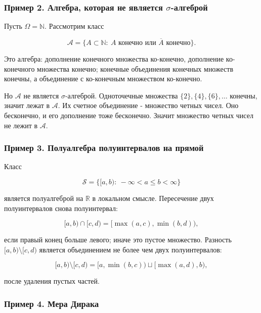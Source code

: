 \documentclass[
  11pt,
  a4paper,
]{article}
\begin{document}
\subsubsection{\texorpdfstring{Пример 2. Алгебра, которая не является
\(\sigma\)-алгеброй}{Пример 2. Алгебра, которая не является \textbackslash sigma-алгеброй}}\label{ux43fux440ux438ux43cux435ux440-2.-ux430ux43bux433ux435ux431ux440ux430-ux43aux43eux442ux43eux440ux430ux44f-ux43dux435-ux44fux432ux43bux44fux435ux442ux441ux44f-sigma-ux430ux43bux433ux435ux431ux440ux43eux439}

Пусть \(\Omega=\mathbb N\). Рассмотрим класс

\[
\mathcal A=\{A\subset\mathbb N:\ A \text{ конечно или } \overline{A} \text{ конечно}\}.
\]

Это алгебра: дополнение конечного множества ко-конечно, дополнение
ко-конечного множества конечно; конечные объединения конечных множеств
конечны, а объединение с ко-конечным множеством ко-конечно.

Но \(\mathcal A\) не является \(\sigma\)-алгеброй. Одноточечные
множества \(\{2\},\{4\},\{6\},\ldots\) конечны, значит лежат в
\(\mathcal A\). Их счетное объединение - множество четных чисел. Оно
бесконечно, и его дополнение тоже бесконечно. Значит множество четных
чисел не лежит в \(\mathcal A\).

\subsubsection{Пример 3. Полуалгебра полуинтервалов на
прямой}\label{ux43fux440ux438ux43cux435ux440-3.-ux43fux43eux43bux443ux430ux43bux433ux435ux431ux440ux430-ux43fux43eux43bux443ux438ux43dux442ux435ux440ux432ux430ux43bux43eux432-ux43dux430-ux43fux440ux44fux43cux43eux439}

Класс

\[
\mathcal S=\{[a,b):\ -\infty<a\le b<\infty\}
\]

является полуалгеброй на \(\mathbb R\) в локальном смысле. Пересечение
двух полуинтервалов снова полуинтервал:

\[
[a,b)\cap[c,d)=[\max(a,c),\min(b,d)),
\]

если правый конец больше левого; иначе это пустое множество. Разность
\([a,b)\setminus[c,d)\) является объединением не более чем двух
полуинтервалов:

\[
[a,b)\setminus[c,d)= [a,\min(b,c))\sqcup[\max(a,d),b),
\]

после удаления пустых частей.

\subsubsection{Пример 4. Мера
Дирака}\label{ux43fux440ux438ux43cux435ux440-4.-ux43cux435ux440ux430-ux434ux438ux440ux430ux43aux430}
\end{document}
